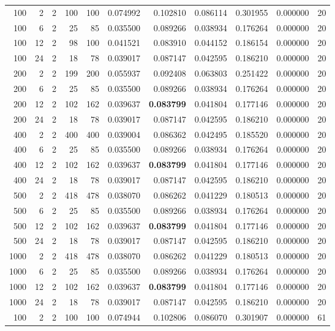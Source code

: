 \begin{table}
\begin{tabular}{rrrrrrrrrrr}
100 & 2 & 2 & 100 & 100 & 0.074992 & 0.102810 & 0.086114 & 0.301955 & 0.000000 & 20 \\
100 & 6 & 2 & 25 & 85 & 0.035500 & 0.089266 & 0.038934 & 0.176264 & 0.000000 & 20 \\
100 & 12 & 2 & 98 & 100 & 0.041521 & 0.083910 & 0.044152 & 0.186154 & 0.000000 & 20 \\
100 & 24 & 2 & 18 & 78 & 0.039017 & 0.087147 & 0.042595 & 0.186210 & 0.000000 & 20 \\
200 & 2 & 2 & 199 & 200 & 0.055937 & 0.092408 & 0.063803 & 0.251422 & 0.000000 & 20 \\
200 & 6 & 2 & 25 & 85 & 0.035500 & 0.089266 & 0.038934 & 0.176264 & 0.000000 & 20 \\
200 & 12 & 2 & 102 & 162 & 0.039637 & \textbf{0.083799} & 0.041804 & 0.177146 & 0.000000 & 20 \\
200 & 24 & 2 & 18 & 78 & 0.039017 & 0.087147 & 0.042595 & 0.186210 & 0.000000 & 20 \\
400 & 2 & 2 & 400 & 400 & 0.039004 & 0.086362 & 0.042495 & 0.185520 & 0.000000 & 20 \\
400 & 6 & 2 & 25 & 85 & 0.035500 & 0.089266 & 0.038934 & 0.176264 & 0.000000 & 20 \\
400 & 12 & 2 & 102 & 162 & 0.039637 & \textbf{0.083799} & 0.041804 & 0.177146 & 0.000000 & 20 \\
400 & 24 & 2 & 18 & 78 & 0.039017 & 0.087147 & 0.042595 & 0.186210 & 0.000000 & 20 \\
500 & 2 & 2 & 418 & 478 & 0.038070 & 0.086262 & 0.041229 & 0.180513 & 0.000000 & 20 \\
500 & 6 & 2 & 25 & 85 & 0.035500 & 0.089266 & 0.038934 & 0.176264 & 0.000000 & 20 \\
500 & 12 & 2 & 102 & 162 & 0.039637 & \textbf{0.083799} & 0.041804 & 0.177146 & 0.000000 & 20 \\
500 & 24 & 2 & 18 & 78 & 0.039017 & 0.087147 & 0.042595 & 0.186210 & 0.000000 & 20 \\
1000 & 2 & 2 & 418 & 478 & 0.038070 & 0.086262 & 0.041229 & 0.180513 & 0.000000 & 20 \\
1000 & 6 & 2 & 25 & 85 & 0.035500 & 0.089266 & 0.038934 & 0.176264 & 0.000000 & 20 \\
1000 & 12 & 2 & 102 & 162 & 0.039637 & \textbf{0.083799} & 0.041804 & 0.177146 & 0.000000 & 20 \\
1000 & 24 & 2 & 18 & 78 & 0.039017 & 0.087147 & 0.042595 & 0.186210 & 0.000000 & 20 \\
100 & 2 & 2 & 100 & 100 & 0.074944 & 0.102806 & 0.086070 & 0.301907 & 0.000000 & 61 \\

\end{tabular}
\end{table}
